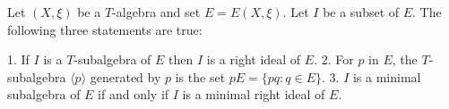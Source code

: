 Let $(X, \xi)$ be a $T$-algebra and set $E = E(X, \xi)$. Let $I$ be a subset of $E$. The following three statements are true:

1. If $I$ is a $T$-subalgebra of $E$ then $I$ is a right ideal of $E$.
2. For $p$ in $E$, the $T$-subalgebra $\langle p \rangle$ generated by $p$ is the set $pE = \{pq : q \in E\}$.
3. $I$ is a minimal subalgebra of $E$ if and only if $I$ is a minimal right ideal of $E$.
